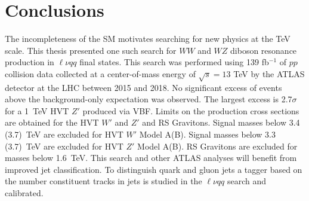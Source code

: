 \label{ch:conclusion}
\chapter{Conclusions}
The incompleteness of the SM motivates searching for new physics at the TeV scale. This thesis presented one such search for $WW$ and $WZ$ diboson resonance production in $\ell \nu qq $ final states. This search was performed using 139 fb$^{-1}$ of $pp$ collision data collected at a center-of-mass energy of $\sqrt{s}=13$ TeV by the ATLAS detector at the LHC between 2015 and 2018. No significant excess of events above the background-only expectation was observed. The largest excess is 2.7$\sigma$ for a 1~TeV HVT $Z'$ produced via VBF. Limits on the production cross sections are obtained for the HVT $W'$ and $Z'$ and RS Gravitons. Signal masses below 3.4 (3.7)~TeV are excluded for HVT $W'$ Model A(B). Signal masses below 3.3 (3.7)~TeV are excluded for HVT $Z'$ Model A(B). RS Gravitons are excluded for masses below 1.6~TeV. This search and other ATLAS analyses will benefit from improved jet classification. To distinguish quark and gluon jets a tagger based on the number constituent tracks in jets is studied in the $\ell \nu qq$ search and calibrated. 
